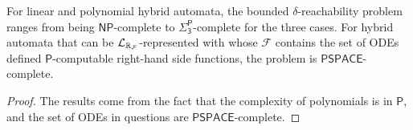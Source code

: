 \documentclass[12pt]{article}
\begin{document}
\begin{corollary}
For linear and polynomial hybrid automata, the bounded $\delta$-reachability problem ranges from being $\mathsf{NP}$-complete to $\mathsf{\Sigma_3^P}$-complete for the three cases. For hybrid automata that can be $\mathcal{L}_{\mathbb{R}_{\mathcal{F}}}$-represented with whose $\mathcal{F}$ contains the set of ODEs defined $\mathsf{P}$-computable right-hand side functions, the problem is $\mathsf{PSPACE}$-complete.
\end{corollary}
\begin{proof}
The results come from the fact that the complexity of polynomials is in $\mathsf{P}$, and the set of ODEs in questions are $\mathsf{PSPACE}$-complete.
\end{proof}


\newpage
\end{document}
